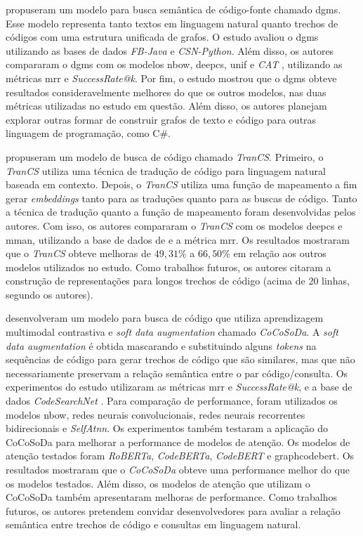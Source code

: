 \textcite{Ling2021DeepGM} propuseram um modelo para busca semântica de código-fonte chamado \gls{dgms}. Esse modelo representa tanto textos em linguagem natural quanto trechos de códigos com uma estrutura unificada de grafos. O estudo avaliou o \gls{dgms} utilizando as bases de dados \textit{FB-Java} e \textit{CSN-Python}. Além disso, os autores compararam o \gls{dgms} com os modelos \gls{nbow}, \gls{deepcs}, \gls{unif} e \textit{CAT} \cite{Haldar2020AMA}, utilizando as métricas \gls{mrr} e \textit{SuccessRate@k}. Por fim, o estudo mostrou que o \gls{dgms} obteve resultados consideravelmente melhores do que os outros modelos, nas duas métricas utilizadas no estudo em questão. Além disso, os autores planejam explorar outras formar de construir grafos de texto e código para outras linguagem de programação, como C\#.

\textcite{Sun2022CodeSB} propuseram um modelo de busca de código chamado \textit{TranCS}. Primeiro, o \textit{TranCS} utiliza uma técnica de tradução de código para linguagem natural baseada em contexto. Depois, o \textit{TranCS} utiliza uma função de mapeamento a fim gerar \textit{embeddings} tanto para as traduções quanto para as buscas de código. Tanto a técnica de tradução quanto a função de mapeamento foram desenvolvidas pelos autores.
Com isso, os autores compararam o \textit{TranCS} com os modelos \gls{deepcs} e \gls{mman}, utilizando a base de dados de \cite{Husain2019CodeSearchNetCE} e a métrica \gls{mrr}. Os resultados mostraram que o \textit{TranCS} obteve melhoras de $49,31\%$ a $66,50\%$ em relação aos outros modelos utilizados no estudo. Como trabalhos futuros, os autores citaram a construção de representações para longos trechos de código (acima de 20 linhas, segundo os autores).

\textcite{Shi2022EnhancingSC} desenvolveram um modelo para busca de código que utiliza aprendizagem multimodal contrastiva e \textit{soft data augmentation} chamado \textit{CoCoSoDa}. A \textit{soft data augmentation} é obtida mascarando e substituindo alguns \textit{tokens} na sequências de código para gerar trechos de código que são similares, mas que não necessariamente preservam a relação semântica entre o par código/consulta. Os experimentos do estudo utilizaram as métricas \gls{mrr} e \textit{SuccessRate@k}, e a base de dados \textit{CodeSearchNet} \cite{Husain2019CodeSearchNetCE}. Para comparação de performance, foram utilizados os modelos \gls{nbow}, redes neurais convolucionais, redes neurais recorrentes bidirecionais e \textit{SelfAtnn}. Os experimentos também testaram a aplicação do CoCoSoDa para melhorar a performance de modelos de atenção. Os modelos de atenção testados foram \textit{RoBERTa}, \textit{CodeBERTa},
\textit{CodeBERT} e \gls{graphcodebert}. Os resultados mostraram que o \textit{CoCoSoDa} obteve uma performance melhor do que os modelos testados. Além disso, os modelos de atenção que utilizam o CoCoSoDa também apresentaram melhoras de performance. Como trabalhos futuros, os autores pretendem convidar desenvolvedores para avaliar a relação semântica entre trechos de código e consultas em linguagem natural.

